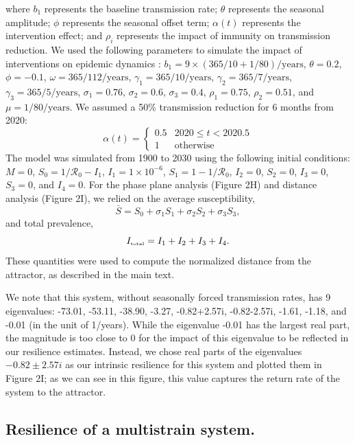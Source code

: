 \documentclass[12pt]{article}
\newcommand{\tsub}[2]{#1_{{\textrm{\tiny #2}}}}
\begin{document}
where $b_1$ represents the baseline transmission rate; $\theta$ represents the seasonal amplitude; $\phi$ represents the seasonal offset term; $\alpha(t)$ represents the intervention effect; and $\rho_i$ represents the impact of immunity on transmission reduction.
We used the following parameters to simulate the impact of interventions on epidemic dynamics \citep{pitzer2015environmental}: $b_1 = 9 \times (365/10+1/80)/\mathrm{years}$, $\theta = 0.2$, $\phi = -0.1$, $\omega=365/112/\mathrm{years}$, $\gamma_1=365/10/\mathrm{years}$, $\gamma_2=365/7/\mathrm{years}$, $\gamma_3=365/5/\mathrm{years}$, $\sigma_1 = 0.76$, $\sigma_2 = 0.6$, $\sigma_3 = 0.4$, $\rho_1 = 0.75$, $\rho_2 = 0.51$, and $\mu = 1/80/\mathrm{years}$.
We assumed a 50\% transmission reduction for 6 months from 2020:
\begin{equation}
\alpha(t) = \begin{cases}
0.5 & 2020 \leq t< 2020.5\\
1 & \textrm{otherwise}
\end{cases}
\end{equation}
The model was simulated from 1900 to 2030 using the following initial conditions: $M=0$, $S_0=1/\mathcal R_0-I_1$, $I_1=1\times 10^{-6}$, $S_1=1-1/\mathcal R_0$, $I_2=0$, $S_2=0$, $I_3=0$, $S_3=0$, and $I_4=0$.
For the phase plane analysis (Figure 2H) and distance analysis (Figure 2I), we relied on the average susceptibility,
\begin{equation}
\bar{S} = S_0 + \sigma_1 S_1 + \sigma_2 S_2 + \sigma_3 S_3,
\end{equation}
and total prevalence,
\begin{equation}
\tsub{I}{total} = I_1 + I_2 + I_3 + I_4.
\end{equation}
These quantities were used to compute the normalized distance from the attractor, as described in the main text.

We note that this system, without seasonally forced transmission rates, has 9 eigenvalues: -73.01, -53.11, -38.90, -3.27, -0.82+2.57i, -0.82-2.57i, -1.61, -1.18, and -0.01 (in the unit of 1/years). 
While the eigenvalue -0.01 has the largest real part, the magnitude is too close to 0 for the impact of this eigenvalue to be reflected in our resilience estimates.
Instead, we chose real parts of the eigenvalues $-0.82\pm2.57i$ as our intrinsic resilience for this system and plotted them in Figure 2I;
as we can see in this figure, this value captures the return rate of the system to the attractor.

\subsection*{Resilience of a multistrain system.}
\end{document}
